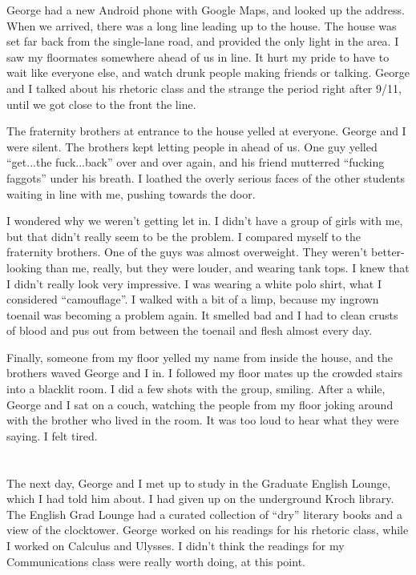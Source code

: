 George had a new Android phone with Google Maps, and looked up the address.
When we arrived, there was a long line leading up to the house.  The house was
set far back from the single-lane road, and provided the only light in the area.
I saw my floormates somewhere ahead of us in line.   It hurt my pride to have to
wait like everyone else, and watch drunk people making friends or talking.
George and I talked about his rhetoric class and the strange the period right
after 9/11, until we got close to the front the line.
 
The fraternity brothers at entrance to the house yelled at everyone.  George and
I were silent.  The brothers kept letting people in ahead of us.  One guy yelled
``get...the fuck...back'' over and over again, and his friend mutterred
``fucking faggots'' under his breath.  I loathed the overly serious faces of the
other students waiting in line with me, pushing towards the door.

I wondered why we weren't getting let in.  I didn't have a group of girls with
me, but that didn't really seem to be the problem.  I compared myself to the
fraternity brothers.  One of the guys was almost overweight.  They weren't
better-looking than me, really, but they were louder, and wearing tank tops.  I
knew that I didn't really look very impressive.  I was wearing a white polo
shirt, what I considered ``camouflage''.  I walked with a bit of a limp, because
my ingrown toenail was becoming a problem again.  It smelled bad and I had to
clean crusts of blood and pus out from between the toenail and flesh almost
every day.

Finally, someone from my floor yelled my name from inside the house, and the
brothers waved George and I in.  I followed my floor mates up the crowded stairs
into a blacklit room.  I did a few shots with the group, smiling.  After a
while, George and I sat on a couch, watching the people from my floor joking
around with the brother who lived in the room.  It was too loud to hear what
they were saying.  I felt tired.

\section{}

The next day, George and I met up to study in the Graduate English Lounge, which
I had told him about.  I had given up on the underground Kroch library.  The
English Grad Lounge  had a curated collection of ``dry'' literary books and a
view of the clocktower.  George worked on his readings for his rhetoric class,
while I worked on Calculus and Ulysses.  I didn't think the readings for my
Communications class were really worth doing, at this point.

